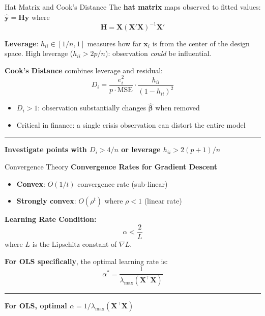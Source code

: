 \documentclass[8pt,aspectratio=169]{beamer}
\newcommand{\bottomnote}[1]{%
\vfill
\vspace{-2mm}
\textcolor{mllavender2}{\rule{\textwidth}{0.4pt}}
\vspace{1mm}
\footnotesize
\textbf{#1}
}
\begin{document}
\begin{frame}[t]{Hat Matrix and Cook's Distance}
  The \textbf{hat matrix} maps observed to fitted values: $\hat{\mathbf{y}} = \mathbf{Hy}$ where
  \begin{equation}
    \mathbf{H} = \mathbf{X}(\mathbf{X}'\mathbf{X})^{-1}\mathbf{X}'
  \end{equation}

  \textbf{Leverage}: $h_{ii} \in [1/n, 1]$ measures how far $\mathbf{x}_i$ is from the center of the design space. High leverage ($h_{ii} > 2p/n$): observation \emph{could} be influential.

  \textbf{Cook's Distance} combines leverage and residual:
  \begin{equation}
    D_i = \frac{e_i^2}{p \cdot \text{MSE}} \cdot \frac{h_{ii}}{(1 - h_{ii})^2}
  \end{equation}

  \begin{itemize}
    \item $D_i > 1$: observation substantially changes $\hat{\boldsymbol{\beta}}$ when removed
    \item Critical in finance: a single crisis observation can distort the entire model
  \end{itemize}

  \bottomnote{Investigate points with $D_i > 4/n$ or leverage $h_{ii} > 2(p+1)/n$}
\end{frame}

\begin{frame}[t]{Convergence Theory}
  \textbf{Convergence Rates for Gradient Descent}

  \begin{itemize}
    \item \textbf{Convex}: $O(1/t)$ convergence rate (sub-linear)
    \item \textbf{Strongly convex}: $O(\rho^t)$ where $\rho < 1$ (linear rate)
  \end{itemize}

  \vspace{0.5em}
  \textbf{Learning Rate Condition:}
  \begin{equation}
    \alpha < \frac{2}{L}
  \end{equation}
  where $L$ is the Lipschitz constant of $\nabla L$.

  \vspace{0.3em}
  \textbf{For OLS specifically}, the optimal learning rate is:
  \begin{equation}
    \alpha^* = \frac{1}{\lambda_{\max}(\mathbf{X}^\top\mathbf{X})}
  \end{equation}

  \bottomnote{For OLS, optimal $\alpha = 1/\lambda_{\max}(\mathbf{X}^\top\mathbf{X})$}
\end{frame}
\end{document}
